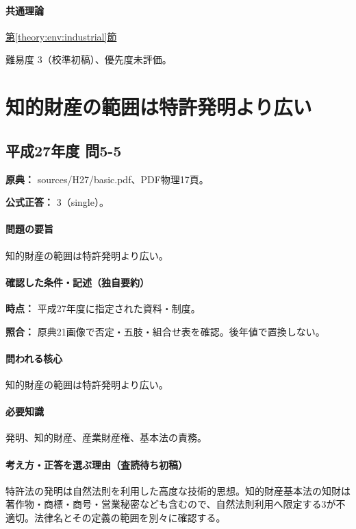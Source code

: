 \paragraph{共通理論} \hyperref[theory:env:industrial]{第\ref*{theory:env:industrial}節}

\par 難易度 3（校準初稿）、優先度未評価。

\section{知的財産の範囲は特許発明より広い}

\subsection{平成27年度 問5-5}
\label{q:h27-reg-basic-5-5}

\noindent\textbf{原典：} sources/H27/basic.pdf、PDF物理17頁。

\textbf{公式正答：} 3（single）。

\paragraph{問題の要旨} 知的財産の範囲は特許発明より広い。

\paragraph{確認した条件・記述（独自要約）}\mbox{}\par

\noindent\textbf{時点：} 平成27年度に指定された資料・制度。\par

\noindent\textbf{照合：} 原典21画像で否定・五肢・組合せ表を確認。後年値で置換しない。\par

\paragraph{問われる核心} 知的財産の範囲は特許発明より広い。

\paragraph{必要知識} 発明、知的財産、産業財産権、基本法の責務。

\paragraph{考え方・正答を選ぶ理由（査読待ち初稿）} 特許法の発明は自然法則を利用した高度な技術的思想。知的財産基本法の知財は著作物・商標・商号・営業秘密なども含むので、自然法則利用へ限定する3が不適切。法律名とその定義の範囲を別々に確認する。

